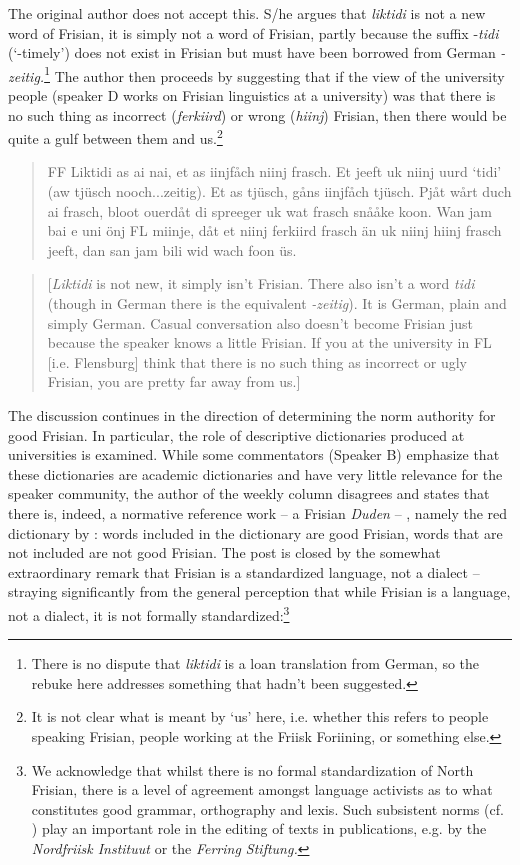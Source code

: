 \documentclass[output=paper]{langsci/langscibook}
\begin{document}
The original author does not accept this. S/he argues that \textit{liktidi} is not a new word of Frisian, it is simply not a word of Frisian, partly because the suffix -\textit{tidi} (‘-timely’) does not exist in Frisian but must have been borrowed from German \textit{{}-zeitig.}\footnote{There is no dispute that \textit{liktidi} is a loan translation from German, so the rebuke here addresses something that hadn’t been suggested.} The author then proceeds by suggesting that if the view of the university people (speaker D works on Frisian linguistics at a university) was that there is no such thing as incorrect (\textit{ferkiird}) or wrong (\textit{hiinj}) Frisian, then there would be quite a gulf between them and us.\footnote{It is not clear what is meant by ‘us’ here, i.e. whether this refers to people speaking Frisian, people working at the Friisk Foriining, or something else.} 

\begin{quote}
FF Liktidi as ai nai, et as iinjfåch niinj frasch. Et jeeft uk niinj uurd ‘tidi’ (aw tjüsch nooch...zeitig). Et as tjüsch, gåns iinjfåch tjüsch. Pjåt wårt duch ai frasch, bloot ouerdåt di spreeger uk wat frasch snååke koon. Wan jam bai e uni önj FL miinje, dåt et niinj ferkiird frasch än uk niinj hiinj frasch jeeft, dan san jam bili wid wach foon üs.
\end{quote}

\begin{quote}
[\textit{Liktidi} is not new, it simply isn’t Frisian. There also isn’t a word \textit{tidi} (though in German there is the equivalent \textit{{}-zeitig}). It is German, plain and simply German. Casual conversation also doesn’t become Frisian just because the speaker knows a little Frisian. If you at the university in FL [i.e. Flensburg] think that there is no such thing as incorrect or ugly Frisian, you are pretty far away from us.]
\end{quote}

The discussion continues in the direction of determining the norm authority for good Frisian. In particular, the role of descriptive dictionaries produced at universities is examined. While some commentators (Speaker B) emphasize that these dictionaries are academic dictionaries and have very little relevance for the speaker community, the author of the weekly column disagrees and states that there is, indeed, a normative reference work – a Frisian \textit{Duden} – , namely the red dictionary by \citet{SjolinEtAl1988}: words included in the dictionary are good Frisian, words that are not included are not good Frisian. The post is closed by the somewhat extraordinary remark that Frisian is a standardized language, not a dialect – straying significantly from the general perception that while Frisian is a language, not a dialect, it is not formally standardized:\footnote{We acknowledge that whilst there is no formal standardization of North Frisian, there is a level of agreement amongst language activists as to what constitutes good grammar, orthography and lexis. Such subsistent norms (cf. \citealt{Gloy1975}) play an important role in the editing of texts in publications, e.g. by the \textit{Nordfriisk Instituut} or the \textit{Ferring Stiftung.}}
\end{document}
